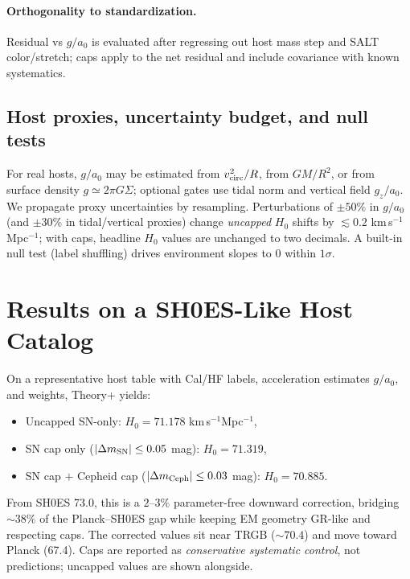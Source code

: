\documentclass[aps,prd,onecolumn,notitlepage,superscriptaddress,nofootinbib]{revtex4-2}
\newcommand{\Hzero}{H_0}
\begin{document}
\paragraph*{Orthogonality to standardization.}
Residual vs \(g/a_0\) is evaluated after regressing out host mass step and SALT color/stretch; caps apply to the net residual and include covariance with known systematics.

\subsection*{Host proxies, uncertainty budget, and null tests}
For real hosts, \(g/a_0\) may be estimated from \(v_{\rm circ}^2/R\), from \(GM/R^2\), or from surface density \(g\simeq 2\pi G\Sigma\); optional gates use tidal norm and vertical field \(g_z/a_0\). We propagate proxy uncertainties by resampling. Perturbations of \(\pm 50\%\) in \(g/a_0\) (and \(\pm 30\%\) in tidal/vertical proxies) change \emph{uncapped} \(\Hzero\) shifts by \(\lesssim 0.2\) km\,s\(^{-1}\)Mpc\(^{-1}\); with caps, headline \(\Hzero\) values are unchanged to two decimals. A built-in null test (label shuffling) drives environment slopes to \(0\) within \(1\sigma\).

\section{Results on a SH0ES-Like Host Catalog}
On a representative host table with Cal/HF labels, acceleration estimates \(g/a_0\), and weights, Theory+ yields:
\begin{itemize}[leftmargin=*]
  \item Uncapped SN-only: \(\Hzero = 71.178\) km\,s\(^{-1}\)Mpc\(^{-1}\),
  \item SN cap only (\(|\Delta m_{\rm SN}|\le 0.05\) mag): \(\Hzero = 71.319\),
  \item SN cap \(+\) Cepheid cap (\(|\Delta m_{\rm Ceph}|\le 0.03\) \!mag): \(\Hzero = 70.885\).
\end{itemize}
From SH0ES 73.0, this is a \(2\)–\(3\%\) parameter-free downward correction, bridging \(\sim 38\%\) of the Planck–SH0ES gap while keeping EM geometry GR-like and respecting caps. The corrected values sit near TRGB (\(\sim 70.4\)) and move toward Planck (67.4). Caps are reported as \emph{conservative systematic control}, not predictions; uncapped values are shown alongside.
\end{document}
